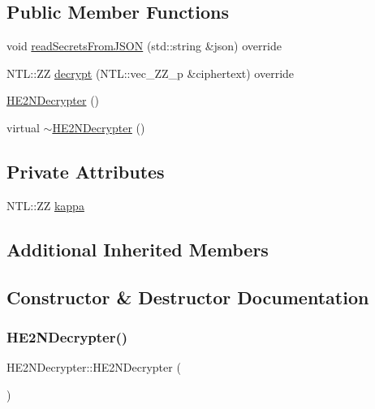 \subsection*{Public Member Functions}
\begin{DoxyCompactItemize}
\item 
void \hyperlink{classHE2NDecrypter_a92b463d8e18d2f06d0680528edfd49c4}{read\+Secrets\+From\+J\+S\+ON} (std\+::string \&json) override
\item 
N\+T\+L\+::\+ZZ \hyperlink{classHE2NDecrypter_aa92e4ddf62a0f2c4199722983e28b0c9}{decrypt} (N\+T\+L\+::vec\+\_\+\+Z\+Z\+\_\+p \&ciphertext) override
\item 
\hyperlink{classHE2NDecrypter_a079e13cfaf35e9f4b32d4301960c6816}{H\+E2\+N\+Decrypter} ()
\item 
virtual \hyperlink{classHE2NDecrypter_a5e6c617b905b370d5186e7d4193fd5b8}{$\sim$\+H\+E2\+N\+Decrypter} ()
\end{DoxyCompactItemize}
\subsection*{Private Attributes}
\begin{DoxyCompactItemize}
\item 
N\+T\+L\+::\+ZZ \hyperlink{classHE2NDecrypter_ad3233fd048ef07f31e4f40ea941cce91}{kappa}
\end{DoxyCompactItemize}
\subsection*{Additional Inherited Members}


\subsection{Constructor \& Destructor Documentation}
\mbox{\label{classHE2NDecrypter_a079e13cfaf35e9f4b32d4301960c6816}} 
\subsubsection{\texorpdfstring{H\+E2\+N\+Decrypter()}{HE2NDecrypter()}}
{\footnotesize\ttfamily H\+E2\+N\+Decrypter\+::\+H\+E2\+N\+Decrypter (\begin{DoxyParamCaption}{ }\end{DoxyParamCaption})}

